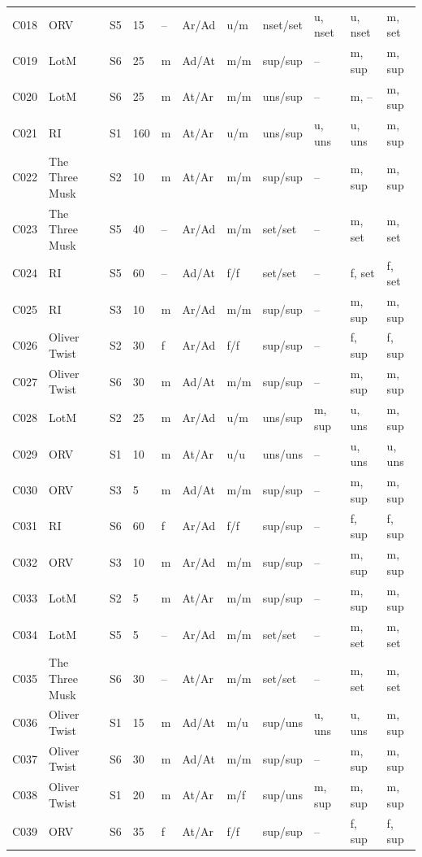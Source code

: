 \documentclass[11pt]{article}
\begin{document}
{\begin{longtable}{p{0.7cm}p{0.7cm}p{0.5cm}p{0.5cm}p{0.8cm}p{0.8cm}p{0.7cm}p{1.3cm}p{1.1cm}p{1.6cm}p{1.3cm}}
C018 & ORV & S5 & 15 & -- & Ar/Ad & u/m & nset/set & u, nset & u, nset & m, set \\
C019 & LotM & S6 & 25 & m & Ad/At & m/m & sup/sup & -- & m, sup & m, sup \\
C020 & LotM & S6 & 25 & m & At/Ar & m/m & uns/sup & -- & m, -- & m, sup \\
C021 & RI & S1 & 160 & m & At/Ar & u/m & uns/sup & u, uns & u, uns & m, sup \\
C022 & The Three Musk & S2 & 10 & m & At/Ar & m/m & sup/sup & -- & m, sup & m, sup \\
C023 & The Three Musk & S5 & 40 & -- & Ar/Ad & m/m & set/set & -- & m, set & m, set \\
C024 & RI & S5 & 60 & -- & Ad/At & f/f & set/set & -- & f, set & f, set \\
C025 & RI & S3 & 10 & m & Ar/Ad & m/m & sup/sup & -- & m, sup & m, sup \\
C026 & Oliver Twist & S2 & 30 & f & Ar/Ad & f/f & sup/sup & -- & f, sup & f, sup \\
C027 & Oliver Twist & S6 & 30 & m & Ad/At & m/m & sup/sup & -- & m, sup & m, sup \\
C028 & LotM & S2 & 25 & m & Ar/Ad & u/m & uns/sup & m, sup & u, uns & m, sup \\
C029 & ORV & S1 & 10 & m & At/Ar & u/u & uns/uns & -- & u, uns & u, uns \\
C030 & ORV & S3 & 5 & m & Ad/At & m/m & sup/sup & -- & m, sup & m, sup \\
C031 & RI & S6 & 60 & f & Ar/Ad & f/f & sup/sup & -- & f, sup & f, sup \\
C032 & ORV & S3 & 10 & m & Ar/Ad & m/m & sup/sup & -- & m, sup & m, sup \\
C033 & LotM & S2 & 5 & m & At/Ar & m/m & sup/sup & -- & m, sup & m, sup \\
C034 & LotM & S5 & 5 & -- & Ar/Ad & m/m & set/set & -- & m, set & m, set \\
C035 & The Three Musk & S6 & 30 & -- & At/Ar & m/m & set/set & -- & m, set & m, set \\
C036 & Oliver Twist & S1 & 15 & m & Ad/At & m/u & sup/uns & u, uns & u, uns & m, sup \\
C037 & Oliver Twist & S6 & 30 & m & Ad/At & m/m & sup/sup & -- & m, sup & m, sup \\
C038 & Oliver Twist & S1 & 20 & m & At/Ar & m/f & sup/uns & m, sup & m, sup & m, sup \\
C039 & ORV & S6 & 35 & f & At/Ar & f/f & sup/sup & -- & f, sup & f, sup \\

\end{longtable}}
\end{document}
